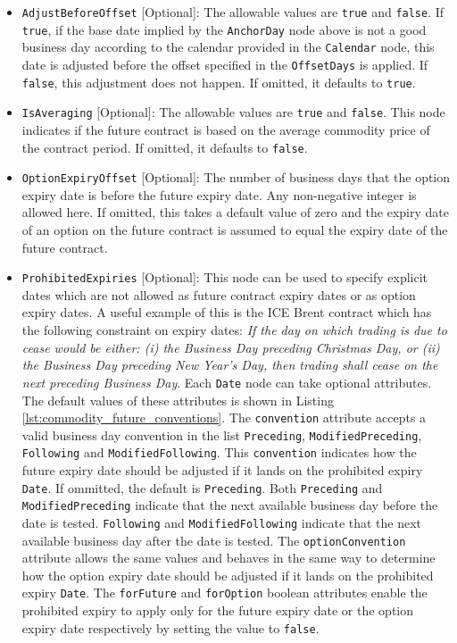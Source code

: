 \begin{itemize}
\item \lstinline!AdjustBeforeOffset! [Optional]: The allowable values are \lstinline!true! and \lstinline!false!. If \lstinline!true!, if the base date implied by the \lstinline!AnchorDay! node above is not a good business day according to the calendar provided in the \lstinline!Calendar! node, this date is adjusted before the offset specified in the \lstinline!OffsetDays! is applied. If \lstinline!false!, this adjustment does not happen. If omitted, it defaults to \lstinline!true!. 
\item \lstinline!IsAveraging! [Optional]: The allowable values are \lstinline!true! and \lstinline!false!. This node indicates if the future contract is based on the average commodity price of the contract period. If omitted, it defaults to \lstinline!false!.
\item \lstinline!OptionExpiryOffset! [Optional]: The number of business days that the option expiry date is before the future expiry date. Any non-negative integer is allowed here. If omitted, this takes a default value of zero and the expiry date of an option on the future contract is assumed to equal the expiry date of the future contract.
\item \lstinline!ProhibitedExpiries! [Optional]: This node can be used to specify explicit dates which are not allowed as future contract expiry dates or as option expiry dates. A useful example of this is the ICE Brent contract which has the following constraint on expiry dates: \emph{If the day on which trading is due to cease would be either: (i) the Business Day preceding Christmas Day, or (ii) the Business Day preceding New Year’s Day, then trading shall cease on the next preceding Business Day}. Each \lstinline!Date! node can take optional attributes. The default values of these attributes is shown in Listing \ref{lst:commodity_future_conventions}. The \lstinline!convention! attribute accepts a valid business day convention in the list \lstinline!Preceding!, \lstinline!ModifiedPreceding!, \lstinline!Following! and \lstinline!ModifiedFollowing!. This \lstinline!convention! indicates how the future expiry date should be adjusted if it lands on the prohibited expiry \lstinline!Date!. If ommitted, the default is \lstinline!Preceding!. Both \lstinline!Preceding! and \lstinline!ModifiedPreceding! indicate that the next available business day before the date is tested. \lstinline!Following! and \lstinline!ModifiedFollowing! indicate that the next available business day after the date is tested. The \lstinline!optionConvention! attribute allows the same values and behaves in the same way to determine how the option expiry date should be adjusted if it lands on the prohibited expiry \lstinline!Date!. The \lstinline!forFuture! and \lstinline!forOption! boolean attributes enable the prohibited expiry to apply only for the future expiry date or the option expiry date respectively by setting the value to \lstinline!false!.

\end{itemize}
